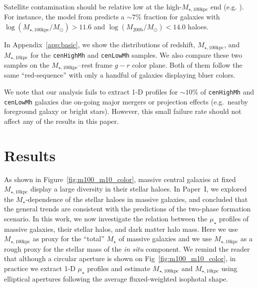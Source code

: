 \documentclass[a4paper,fleqn,usenatbib]{mnras}
\def\rbcg{\texttt{cenHighMh}}
\def\nbcg{\texttt{cenLowMh}}
\def\mstar{{$M_{\star}$}}
\def\logmh{{$\log (M_{\mathrm{200b}}/M_{\odot})$}}
\def\minn{{$M_{\star,10\mathrm{kpc}}$}}
\def\mtot{{$M_{\star,100\mathrm{kpc}}$}}
\def\logmtot{{$\log (M_{\star,100\mathrm{kpc}}/M_{\odot})$}}
\def\mden{{$\mu_{\star}$}}
\begin{document}
    Satellite contamination should be relative low at the high-\mtot{} end
    (e.g. \citealt{Reid2014, Hoshino2015, Saito2016, vanUitert2016}). 
    For instance, the model from \citet{Saito2016} predicts a $\sim 7$\% 
    fraction for galaxies with \logmtot{}$>11.6$ and \logmh$<14.0$ haloes.
    
    In Appendix~\ref{app:basic}, we show the distributions of redshift, \mtot{}, and 
    \minn{} for the \rbcg{} and \nbcg{} samples. 
    We also compare these two samples on the \mtot{}--rest frame $g-r$ color plane. 
    Both of them follow the same ``red-sequence'' with only a handful of galaxies 
    displaying bluer colors.
    
    We note that our analysis fails to extract 1-D profiles for $\sim10$\% of 
    \rbcg{} and \nbcg{} galaxies due on-going major mergers or projection effects 
    (e.g.\ nearby foreground galaxy or bright stars). 
    However, this small failure rate should not affect any of the results in this paper.
    

\section{Results}
    \label{sec:result}
    
    As shown in Figure~\ref{fig:m100_m10_color}, massive central galaxies at fixed  
    \minn{} display a large diversity in their stellar haloes. 
    In Paper~I, we explored the \mstar{}-dependence of the stellar haloes in massive 
    galaxies, and concluded that the general trends are consistent with the predictions 
    of the two-phase formation scenario. 
    In this work, we now investigate the relation between the \mden{} profiles of 
    massive galaxies, their stellar halos, and dark matter halo mass. 
    Here we use \mtot{} as proxy for the ``total'' \mstar{} of massive galaxies and 
    we use \minn{} as a rough proxy for the stellar mass of the \textit{in situ} 
    component.  
    We remind the reader that although a circular aperture is shown on 
    Fig~\ref{fig:m100_m10_color}, in practice we extract 1-D \mden{} profiles and 
    estimate \mtot{} and \minn{} using elliptical apertures following the average 
    fluxed-weighted isophotal shape. 
   
\end{document}
